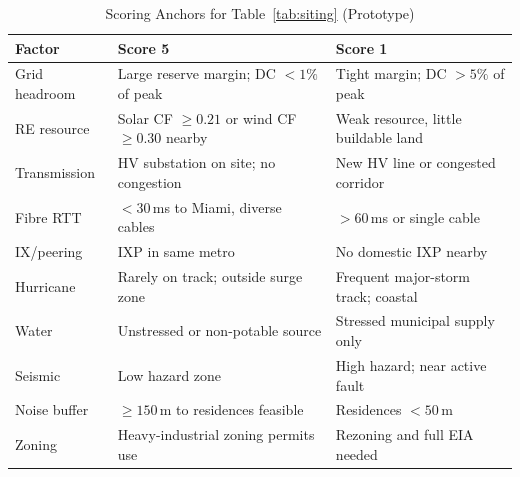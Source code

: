 \documentclass[conference,10pt]{IEEEtran}
\begin{document}
\begin{table}[htbp]
\centering
\caption{Scoring Anchors for Table~\ref{tab:siting} (Prototype)}
\label{tab:rubric}
\scriptsize
\setlength{\tabcolsep}{2pt}
\begin{tabular}{@{}p{1.9cm}p{3.1cm}p{3.1cm}@{}}
\toprule
Factor & Score 5 & Score 1 \\
\midrule
Grid headroom & Large reserve margin; DC ${<}1\%$ of peak & Tight margin; DC ${>}5\%$ of peak \\
RE resource & Solar CF ${\geq}0.21$ or wind CF ${\geq}0.30$ nearby & Weak resource, little buildable land \\
Transmission & HV substation on site; no congestion & New HV line or congested corridor \\
Fibre RTT & ${<}30$\,ms to Miami, diverse cables & ${>}60$\,ms or single cable \\
IX/peering & IXP in same metro & No domestic IXP nearby \\
Hurricane & Rarely on track; outside surge zone & Frequent major-storm track; coastal \\
Water & Unstressed or non-potable source & Stressed municipal supply only \\
Seismic & Low hazard zone & High hazard; near active fault \\
Noise buffer & ${\geq}150$\,m to residences feasible & Residences ${<}50$\,m \\
Zoning & Heavy-industrial zoning permits use & Rezoning and full EIA needed \\
\bottomrule
\end{tabular}
\end{table}
\end{document}
